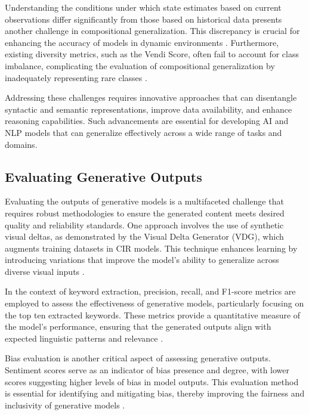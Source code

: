 Understanding the conditions under which state estimates based on current observations differ significantly from those based on historical data presents another challenge in compositional generalization. This discrepancy is crucial for enhancing the accuracy of models in dynamic environments \cite{lathouwers2017memorypaysdiscordhidden}. Furthermore, existing diversity metrics, such as the Vendi Score, often fail to account for class imbalance, complicating the evaluation of compositional generalization by inadequately representing rare classes \cite{pasarkar2024cousinsvendiscorefamily}.



Addressing these challenges requires innovative approaches that can disentangle syntactic and semantic representations, improve data availability, and enhance reasoning capabilities. Such advancements are essential for developing AI and NLP models that can generalize effectively across a wide range of tasks and domains.



\subsection{Evaluating Generative Outputs} \label{subsec:Evaluating Generative Outputs}



Evaluating the outputs of generative models is a multifaceted challenge that requires robust methodologies to ensure the generated content meets desired quality and reliability standards. One approach involves the use of synthetic visual deltas, as demonstrated by the Visual Delta Generator (VDG), which augments training datasets in CIR models. This technique enhances learning by introducing variations that improve the model's ability to generalize across diverse visual inputs \cite{jang2024visualdeltageneratorlarge}.



In the context of keyword extraction, precision, recall, and F1-score metrics are employed to assess the effectiveness of generative models, particularly focusing on the top ten extracted keywords. These metrics provide a quantitative measure of the model's performance, ensuring that the generated outputs align with expected linguistic patterns and relevance \cite{altuncu2022improvingperformanceautomatickeyword}.



Bias evaluation is another critical aspect of assessing generative outputs. Sentiment scores serve as an indicator of bias presence and degree, with lower scores suggesting higher levels of bias in model outputs. This evaluation method is essential for identifying and mitigating bias, thereby improving the fairness and inclusivity of generative models \cite{magee2021intersectionalbiascausallanguage}.



